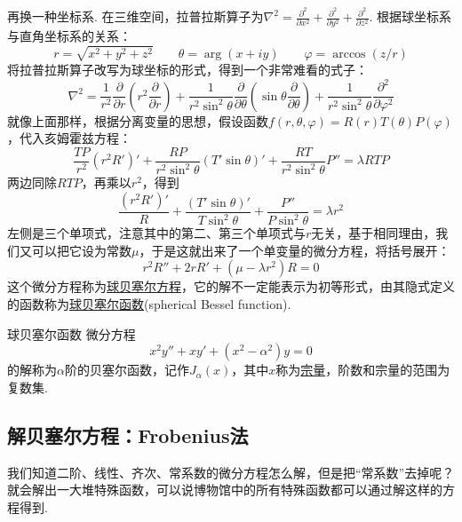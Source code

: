 \documentclass[main.tex]{subfiles}
\begin{document}
再换一种坐标系. 在三维空间，拉普拉斯算子为\(\displaystyle{\nabla^2 = \frac{\partial^2}{\partial x^2}+\frac{\partial^2}{\partial y^2}+\frac{\partial^2}{\partial z^2}}\). 根据球坐标系与直角坐标系的关系：
\[r = \sqrt{x^2+y^2+z^2} \qquad \theta = \arg(x+iy) \qquad \varphi = \arccos(z/r)\]
将拉普拉斯算子改写为球坐标的形式，得到一个非常难看的式子：
\[\nabla^2 = \frac{1}{r^2}\frac{\partial}{\partial r}\left(r^2 \frac{\partial}{\partial r}\right)+\frac{1}{r^2\sin^2\theta}\frac{\partial}{\partial \theta}\left(\sin\theta \frac{\partial}{\partial \theta}\right)+\frac{1}{r^2\sin^2\theta}\frac{\partial^2}{\partial \varphi^2}\]
就像上面那样，根据分离变量的思想，假设函数\(f(r,\theta, \varphi)=R(r)T(\theta)P(\varphi)\)，代入亥姆霍兹方程：
\[\frac{TP}{r^2}\left(r^2 R'\right)'+\frac{RP}{r^2\sin^2\theta}\left(T'\sin\theta\right)'+\frac{RT}{r^2\sin^2\theta}P''=\lambda RTP\]
两边同除\(RTP\)，再乘以\(r^2\)，得到
\[\frac{\left(r^2 R'\right)'}{R}+\frac{\left(T'\sin\theta\right)'}{T\sin^2\theta}+\frac{P''}{P\sin^2\theta} = \lambda r^2\]
左侧是三个单项式，注意其中的第二、第三个单项式与\(r\)无关，基于相同理由，我们又可以把它设为常数\(\mu\)，于是这就出来了一个单变量的微分方程，将括号展开：
\[r^2R''+2rR'+(\mu-\lambda r^2)R = 0\]
这个微分方程称为\uline{球贝塞尔方程}，它的解不一定能表示为初等形式，由其隐式定义的函数称为\uline{球贝塞尔函数}(spherical Bessel function).

\begin{definition}{球贝塞尔函数}
    微分方程
    \[x^2y″ + xy′ + (x^2-\alpha^2)y = 0\]
    的解称为\(\alpha\)阶的贝塞尔函数，记作\(J_\alpha(x)\)，其中\(x\)称为\uline{宗量}，阶数和宗量的范围为复数集.
\end{definition}

\subsection{解贝塞尔方程：Frobenius法}

我们知道二阶、线性、齐次、常系数的微分方程怎么解，但是把“常系数”去掉呢？就会解出一大堆特殊函数，可以说博物馆中的所有特殊函数都可以通过解这样的方程得到.
\end{document}
